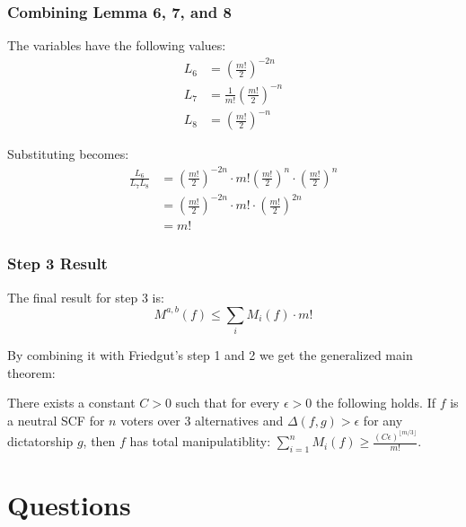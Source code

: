 \documentclass[aspectratio=169]{beamer}
\begin{document}
		\begin{frame}
			\frametitle{Combining Lemma 6, 7, and 8}

			The variables have the following values:
			\begin{align*}
				L_6 &= \left(\frac{m!}{2}\right)^{-2n} \\
				L_7 &= \frac{1}{m!}\left(\frac{m!}{2}\right)^{-n} \\
				L_8 &= \left(\frac{m!}{2}\right)^{-n}
			\end{align*}

			Substituting becomes:
			\begin{align*}
				\frac{L_6}{L_7L_8} &= \left(\frac{m!}{2}\right)^{-2n} \cdot m!\left(\frac{m!}{2}\right)^{n} \cdot \left(\frac{m!}{2}\right)^{n} \\
				&= \left(\frac{m!}{2}\right)^{-2n} \cdot m! \cdot \left(\frac{m!}{2}\right)^{2n} \\
				&= m!
			\end{align*}
		\end{frame}

		\begin{frame}
			\frametitle{Step 3 Result}

			The final result for step 3 is:
			\[
				M^{a,b}(f) \le \sum_i M_i(f) \cdot m!
			\]

			By combining it with Friedgut's step 1 and 2 we get the generalized main theorem:
			\begin{theorem}
				There exists a constant $C > 0$ such that for every $\epsilon > 0$ the following holds. If $f$ is a neutral SCF for $n$ voters over 3 alternatives and $\Delta(f, g) > \epsilon$ for any dictatorship $g$, then $f$ has total manipulatiblity: $\sum^n_{i=1} M_i(f) \ge \frac{(C\epsilon)^{\lfloor m/3 \rfloor}}{m!}$.
			\end{theorem}
		\end{frame}


	\section{Questions}
\end{document}
